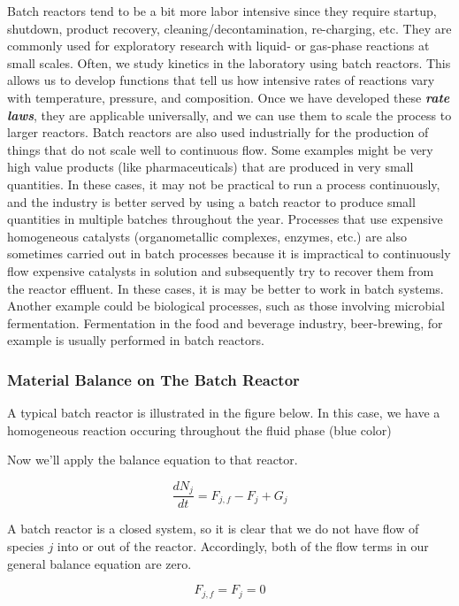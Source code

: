 \documentclass[11pt]{article}
\begin{document}
Batch reactors tend to be a bit more labor intensive since they require
startup, shutdown, product recovery, cleaning/decontamination,
re-charging, etc. They are commonly used for exploratory research with
liquid- or gas-phase reactions at small scales. Often, we study kinetics
in the laboratory using batch reactors. This allows us to develop
functions that tell us how intensive rates of reactions vary with
temperature, pressure, and composition. Once we have developed these
\textbf{\emph{rate laws}}, they are applicable universally, and we can
use them to scale the process to larger reactors. Batch reactors are
also used industrially for the production of things that do not scale
well to continuous flow. Some examples might be very high value products
(like pharmaceuticals) that are produced in very small quantities. In
these cases, it may not be practical to run a process continuously, and
the industry is better served by using a batch reactor to produce small
quantities in multiple batches throughout the year. Processes that use
expensive homogeneous catalysts (organometallic complexes, enzymes,
etc.) are also sometimes carried out in batch processes because it is
impractical to continuously flow expensive catalysts in solution and
subsequently try to recover them from the reactor effluent. In these
cases, it is may be better to work in batch systems. Another example
could be biological processes, such as those involving microbial
fermentation. Fermentation in the food and beverage industry,
beer-brewing, for example is usually performed in batch reactors.

    \hypertarget{material-balance-on-the-batch-reactor}{%
\subsubsection{Material Balance on The Batch
Reactor}\label{material-balance-on-the-batch-reactor}}

A typical batch reactor is illustrated in the figure below. In this
case, we have a homogeneous reaction occuring throughout the fluid phase
(blue color)

Now we'll apply the balance equation to that reactor.

\[\frac{dN_j}{dt} = F_{j,f} - F_j + G_j\]

A batch reactor is a closed system, so it is clear that we do not have
flow of species \(j\) into or out of the reactor. Accordingly, both of
the flow terms in our general balance equation are zero.

\[F_{j,f} = F_j = 0\]
\end{document}
